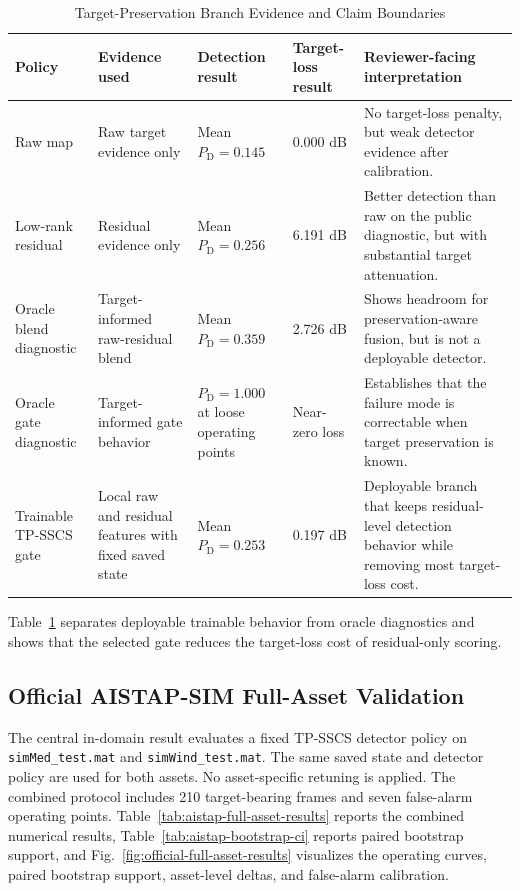 \documentclass[journal]{IEEEtran}
\begin{document}
\begin{table}[!t]
\caption{Target-Preservation Branch Evidence and Claim Boundaries}
\label{tab:gate-preservation-summary}
\centering
\scriptsize
\renewcommand{\arraystretch}{1.15}
\setlength{\tabcolsep}{3pt}
\begin{tabular}{@{}p{}p{}p{}p{}p{}@{}}
\toprule
Policy & Evidence used & Detection result & Target-loss result & Reviewer-facing interpretation \\
\midrule
Raw map & Raw target evidence only & Mean $P_{\mathrm{D}}=0.145$ & 0.000 dB & No target-loss penalty, but weak detector evidence after calibration. \\
Low-rank residual & Residual evidence only & Mean $P_{\mathrm{D}}=0.256$ & 6.191 dB & Better detection than raw on the public diagnostic, but with substantial target attenuation. \\
Oracle blend diagnostic & Target-informed raw-residual blend & Mean $P_{\mathrm{D}}=0.359$ & 2.726 dB & Shows headroom for preservation-aware fusion, but is not a deployable detector. \\
Oracle gate diagnostic & Target-informed gate behavior & $P_{\mathrm{D}}=1.000$ at loose operating points & Near-zero loss & Establishes that the failure mode is correctable when target preservation is known. \\
Trainable TP-SSCS gate & Local raw and residual features with fixed saved state & Mean $P_{\mathrm{D}}=0.253$ & 0.197 dB & Deployable branch that keeps residual-level detection behavior while removing most target-loss cost. \\
\bottomrule
\end{tabular}
\vspace{0.35em}
\parbox{0.94\textwidth}{\scriptsize Table~\ref{tab:gate-preservation-summary} separates deployable trainable behavior from oracle diagnostics and shows that the selected gate reduces the target-loss cost of residual-only scoring.}
\end{table}

\subsection{Official AISTAP-SIM Full-Asset Validation}

The central in-domain result evaluates a fixed TP-SSCS detector policy on \texttt{simMed\_test.mat} and \texttt{simWind\_test.mat}. The same saved state and detector policy are used for both assets. No asset-specific retuning is applied. The combined protocol includes 210 target-bearing frames and seven false-alarm operating points. Table~\ref{tab:aistap-full-asset-results} reports the combined numerical results, Table~\ref{tab:aistap-bootstrap-ci} reports paired bootstrap support, and Fig.~\ref{fig:official-full-asset-results} visualizes the operating curves, paired bootstrap support, asset-level deltas, and false-alarm calibration.
\end{document}
